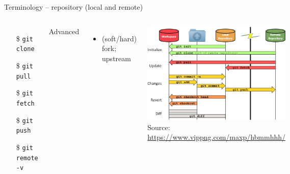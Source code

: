 \documentclass[aspectratio=169]{beamer}
\newcommand{\code}[1]{\texttt{\color{mygreen}#1}}
\begin{document}
\begin{frame}
  {Terminology -- repository (local and remote)}
%
  \begin{columns}
  \begin{itemize}
    \item[\$] \code{git clone}
    \item[\$] \code{git pull}
    \item[\$] \code{git fetch}
    \item[\$] \code{git push}
    \item[\$] \code{git remote -v}
  \end{itemize}

  \vspace{.5cm}

  Advanced
  \begin{itemize}
    \item (soft/hard) fork; upstream
  \end{itemize}
%
%
    \includegraphics[width=\textwidth]{git-png}
  {\tiny Source: \url{https://www.vippng.com/maxp/hbmmhhh/}}
  \end{columns}
%
\end{frame}
\end{document}
